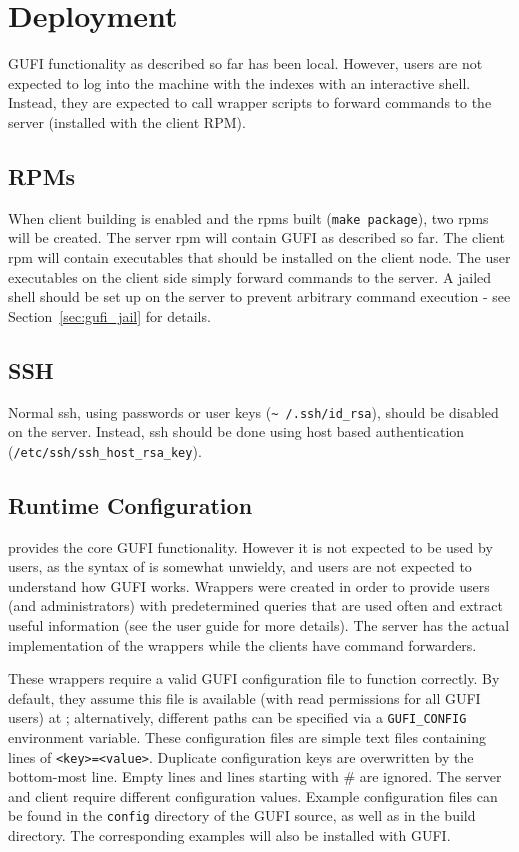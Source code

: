 \section{Deployment}
\label{sec:deploy}
GUFI functionality as described so far has been local. However, users
are not expected to log into the machine with the indexes with an
interactive shell. Instead, they are expected to call wrapper scripts
to forward commands to the server (installed with the client RPM).

\subsection{RPMs}
When client building is enabled and the rpms built (\texttt{make
  package}), two rpms will be created. The server rpm will contain
GUFI as described so far. The client rpm will contain executables that
should be installed on the client node. The user executables on the
client side simply forward commands to the server. A jailed shell
should be set up on the server to prevent arbitrary command execution
- see Section~\ref{sec:gufi_jail} for details.

\subsection{SSH}
Normal ssh, using passwords or user keys (\texttt{\textasciitilde
  /.ssh/id\_rsa}), should be disabled on the server. Instead, ssh
should be done using host based authentication
(\texttt{/etc/ssh/ssh\_host\_rsa\_key}).

\subsection{Runtime Configuration}
\gufiquery provides the core GUFI functionality. However it is not
expected to be used by users, as the syntax of \gufiquery is somewhat
unwieldy, and users are not expected to understand how GUFI
works. Wrappers were created in order to provide users (and
administrators) with predetermined queries that are used often and
extract useful information (see the user guide for more details). The
server has the actual implementation of the wrappers while the clients
have command forwarders.

These wrappers require a valid GUFI configuration file to function correctly.
By default, they assume this file is available (with read permissions for all
GUFI users) at \guficonfigfile; alternatively, different paths can be specified
via a \texttt{GUFI\_CONFIG} environment variable. These configuration files are
simple text files containing lines of \texttt{<key>=<value>}.  Duplicate
configuration keys are overwritten by the bottom-most line. Empty lines and
lines starting with \# are ignored. The server and client require different
configuration values. Example configuration files can be found in the
\texttt{config} directory of the GUFI source, as well as in the build
directory. The corresponding examples will also be installed with GUFI.

